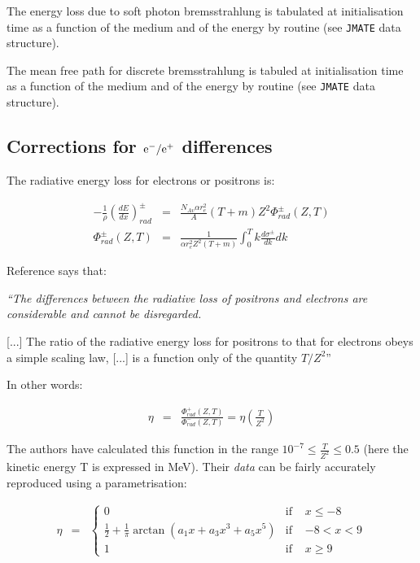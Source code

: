 The energy loss due to soft photon bremsstrahlung is tabulated at
initialisation time as a function of the medium and of the energy by
routine  (see {\tt JMATE} data structure).

The mean free path for discrete bremsstrahlung is tabuled at initialisation 
time as a function
of the medium and of the energy by routine  (see
{\tt JMATE} data structure).

\subsection{Corrections for $\mathrm{e}^-/\mathrm{e}^+$ differences}

The radiative energy loss for electrons or positrons is:

\begin{eqnarray*}
-\frac{1}{\rho} \left ( \frac{dE}{dx} \right )_{rad}^{\pm} & = & 
\frac{N_{Av} \alpha r_e^2}{A} (T+m) Z^2 \Phi_{rad}^{\pm}(Z,T) \\
\Phi^{\pm}_{rad}(Z,T) & = & \frac{1}{\alpha r_{e}^2 Z^2 (T+m)}
\int^{T}_{0}{k\frac{d\sigma^{\pm}}{dk}dk}
\end{eqnarray*}

Reference \cite{bib-KIM1} says that: \\
{\it ``The differences between the radiative loss of positrons
and electrons are considerable and cannot be disregarded.

[...] The ratio of the radiative energy loss for positrons
to that for electrons obeys a simple scaling law, [...] is a
function only of the quantity $T/Z^2$''}

In other words:

\begin{eqnarray*}
\eta & = & \frac{\Phi_{rad}^{+}(Z,T)}{\Phi_{rad}^{-}(Z,T)} = 
\eta \left (\frac{T}{Z^2}\right )
\end{eqnarray*}

The authors have calculated this function in the range $10^{-7}
\leq \frac{T}{Z^2} \leq 0.5$ (here the kinetic energy T is 
expressed in MeV). Their {\it data} can be fairly accurately
reproduced using a parametrisation:

\begin{eqnarray*}
\eta & = & \left \{ 
\begin{array}{llr}
0 & \mbox{if   } & x \leq -8 \\
\frac{1}{2} + \frac{1}{\pi} \arctan \left( a_1 x + a_3 x^3
+ a_5 x^5 \right ) & \mbox{if  } & -8 < x < 9 \\
1 & \mbox{if   } & x \geq 9
\end{array}
\right .
\end{eqnarray*}

